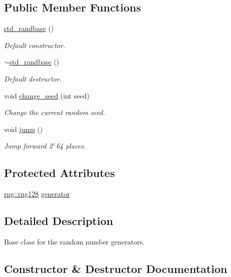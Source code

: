 \subsection*{Public Member Functions}
\begin{DoxyCompactItemize}
\item 
\hyperlink{classstdrand_1_1std__randbase_a8298d43186d6410f30ec0a77f0b90159}{std\+\_\+randbase} ()
\begin{DoxyCompactList}\small\item\em Default constructor. \end{DoxyCompactList}\item 
\hyperlink{classstdrand_1_1std__randbase_a5280080005689ab2ff6dae6de10a3faa}{$\sim$std\+\_\+randbase} ()
\begin{DoxyCompactList}\small\item\em Default destructor. \end{DoxyCompactList}\item 
void \hyperlink{classstdrand_1_1std__randbase_ae4d2a7ab5253b8d21ce4ede8f9988f24}{change\+\_\+seed} (int seed)
\begin{DoxyCompactList}\small\item\em Change the current random seed. \end{DoxyCompactList}\item 
void \hyperlink{classstdrand_1_1std__randbase_a1f59d641467d33c51df65651212dac1f}{jump} ()
\begin{DoxyCompactList}\small\item\em Jump forward 2$^\wedge$64 places. \end{DoxyCompactList}\end{DoxyCompactItemize}
\subsection*{Protected Attributes}
\begin{DoxyCompactItemize}
\item 
\hyperlink{structrng_1_1rng128}{rng\+::rng128} \hyperlink{classstdrand_1_1std__randbase_a04dc8f49595791e10967b74a4b137b53}{generator}
\end{DoxyCompactItemize}


\subsection{Detailed Description}
Base class for the random number generators. 

\subsection{Constructor \& Destructor Documentation}
